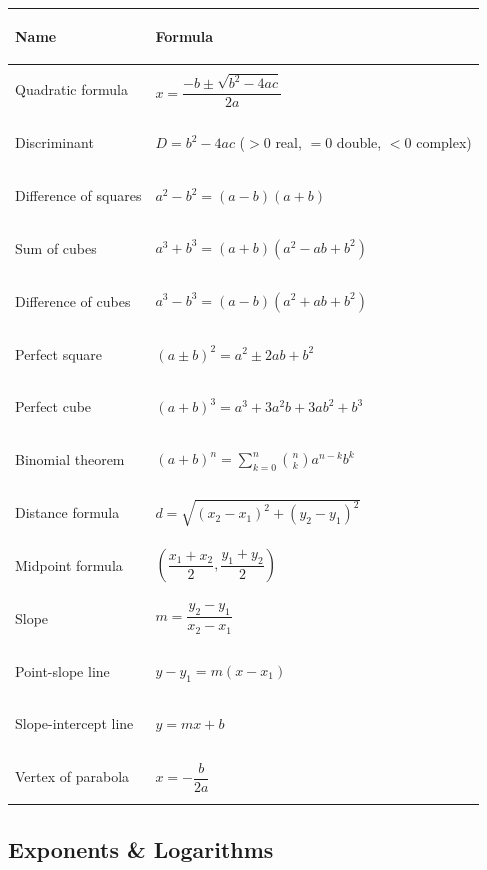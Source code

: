 \documentclass[11pt, letterpaper]{article}
\begin{document}
\noindent
{\small\renewcommand{\arraystretch}{1.6}
\begin{tabularx}{\textwidth}{>{\bfseries\raggedright\arraybackslash}p{4cm}
                              >{\raggedright\arraybackslash}X}
\toprule
\rowcolor{tableheaderpurple}
\textbf{Name} & \textbf{Formula} \\
\midrule
\rowcolor{rowPu} Quadratic formula        & $x = \dfrac{-b \pm \sqrt{b^2 - 4ac}}{2a}$ \\
\rowcolor{rowA}  Discriminant             & $D = b^2 - 4ac$ \; ($>0$ real, $=0$ double, $<0$ complex) \\
\rowcolor{rowPu} Difference of squares    & $a^2 - b^2 = (a-b)(a+b)$ \\
\rowcolor{rowA}  Sum of cubes             & $a^3 + b^3 = (a+b)(a^2 - ab + b^2)$ \\
\rowcolor{rowPu} Difference of cubes      & $a^3 - b^3 = (a-b)(a^2 + ab + b^2)$ \\
\rowcolor{rowA}  Perfect square           & $(a \pm b)^2 = a^2 \pm 2ab + b^2$ \\
\rowcolor{rowPu} Perfect cube             & $(a+b)^3 = a^3 + 3a^2 b + 3ab^2 + b^3$ \\
\rowcolor{rowA}  Binomial theorem         & $(a+b)^n = \sum_{k=0}^{n} \binom{n}{k} a^{n-k} b^k$ \\
\rowcolor{rowPu} Distance formula         & $d = \sqrt{(x_2-x_1)^2 + (y_2-y_1)^2}$ \\
\rowcolor{rowA}  Midpoint formula         & $\left(\dfrac{x_1+x_2}{2}, \dfrac{y_1+y_2}{2}\right)$ \\
\rowcolor{rowPu} Slope                    & $m = \dfrac{y_2 - y_1}{x_2 - x_1}$ \\
\rowcolor{rowA}  Point-slope line         & $y - y_1 = m(x - x_1)$ \\
\rowcolor{rowPu} Slope-intercept line     & $y = mx + b$ \\
\rowcolor{rowA}  Vertex of parabola       & $x = -\dfrac{b}{2a}$ \\
\bottomrule
\end{tabularx}}

\subsection*{Exponents \& Logarithms}
\end{document}
